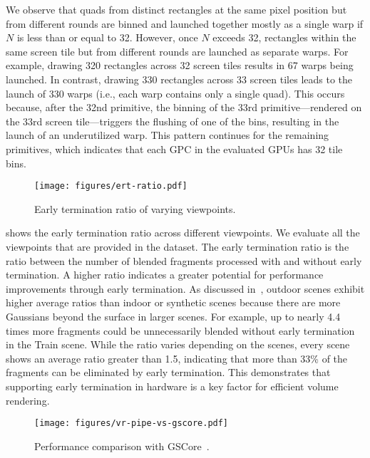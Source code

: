 We observe that quads from distinct rectangles at the same pixel position but
from different rounds are binned and launched together mostly as a single warp
if $N$ is less than or equal to 32. 
%
However, once $N$ exceeds 32, rectangles within the same screen tile but from
different rounds are launched as separate warps. 
%
For example, drawing 320 rectangles across 32 screen tiles results in 67 warps
being launched.
%
In contrast, drawing 330 rectangles across 33 screen tiles leads to the launch
of 330 warps (i.e., each warp contains only a single quad).
%
This occurs because, after the 32nd primitive, the binning of the 33rd
primitive---rendered on the 33rd screen tile---triggers the flushing of one of
the bins, resulting in the launch of an underutilized warp. This pattern
continues for the remaining primitives, which indicates that each GPC in the
evaluated GPUs has 32 tile bins.



\begin{figure}[t]
  \centering
  \texttt{[image: figures/ert-ratio.pdf]}
  \caption{Early termination ratio of varying viewpoints.}
  \vspace{-0.10in}
  \label{fig:ert-ratio}
\end{figure}

 shows the early termination ratio across different
viewpoints. We evaluate all the viewpoints that are provided in the dataset.
The early termination ratio is the ratio between the number of blended
fragments processed with and without early termination. A higher ratio
indicates a greater potential for performance improvements through early
termination. 
%
As discussed in~, outdoor scenes exhibit higher average
ratios than indoor or synthetic scenes because there are more Gaussians beyond
the surface in larger scenes. For example, up to nearly 4.4 times more
fragments could be unnecessarily blended without early termination in the Train
scene.
%
While the ratio varies depending on the scenes, every scene shows an average
ratio greater than 1.5, indicating that more than 33\% of the fragments can be
eliminated by early termination. 
%
This demonstrates that supporting early termination in hardware is a key factor
for efficient volume rendering.

\begin{figure}[t]
  \centering
  \texttt{[image: figures/vr-pipe-vs-gscore.pdf]}
  \caption{Performance comparison with GSCore~\cite{lee:lee24}.}
  \vspace{-0.1in}
  \label{fig:vr-pipe-vs-gscore}
\end{figure}

